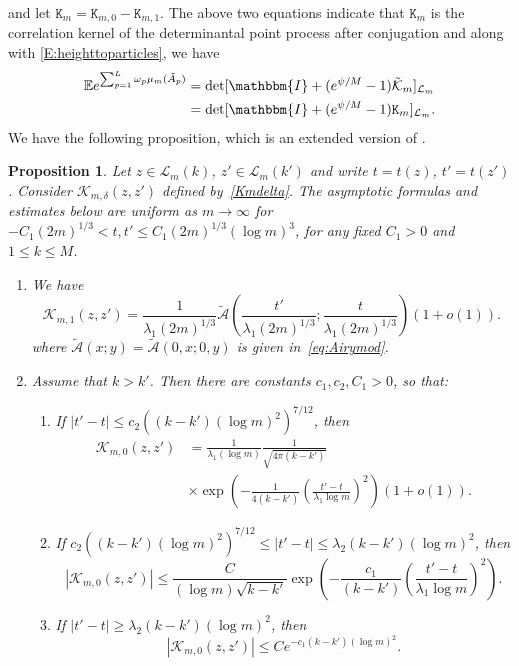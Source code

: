 \documentclass[11pt,twoside]{amsart}
\theoremstyle{plain}
\newtheorem{prop}[thm]{Proposition}
\numberwithin{quest}{section}
\theoremstyle{remark}
\numberwithin{rem}{section}
\theoremstyle{definition}
\begin{document}
and let $\mathtt{K}_m = \mathtt{K}_{m, 0} - \mathtt{K}_{m,1}.$  The above two equations indicate that $\mathtt{K}_m$ is the correlation kernel of the determinantal point process after conjugation and along with \eqref{E:heighttoparticles}, we have
\begin{equation*}
	\begin{split}
		\mathbb{E}e^{\sum_{p=1}^{L} \omega_p \mu_m(\tilde A_p)}&=\det[\mathbbm{I}+(e^{\psi/M}-1)\tilde{\mathcal{K}}_m]_{\mathcal{L}_m}\\
		&=\det[\mathbbm{I}+(e^{\psi/M}-1)\mathtt{K}_m]_{\mathcal{L}_m}.
	\end{split}
\end{equation*}
We have the following proposition, which is an extended version of \cite[Proposition 3.1]{BCJ18}.
\begin{prop} \label{P:airylimit_asymptotics}
	Let $z \in \mathcal{L}_m(k)$, $z' \in \mathcal{L}_m(k')$ and write $t=t(z)$, $t'=t(z')$.  Consider $\mathcal{K}_{m,\delta}(z,z')$ defined by~\eqref{Kmdelta}. 
	The asymptotic formulas and estimates below are uniform as $m\to\infty$ for $-C_1 (2m)^{1/3}< t,t' \leq C_1(2m)^{1/3}(\log m)^3$, for any fixed $C_1>0$ and $1 \leq k \leq M$. 
	\begin{enumerate}[label=\arabic*.]
		\item We have
		\begin{equation*}
			\mathcal{K}_{m,1}(z,z') = \frac{1}{\lambda_1(2m)^{1/3}} \tilde{\mathcal{A}}\left(\frac{t'}{\lambda_1(2m)^{1/3}};\frac{t}{\lambda_1(2m)^{1/3}} \right)(1+o(1)).
		\end{equation*}
		where $\tilde{\mathcal{A}}(x ;y) = \tilde{\mathcal{A}}(0, x; 0, y)$ is given in~\eqref{eq:Airymod}.
		\item Assume that $k>k'$. Then there are constants $c_1,c_2,C_1>0$, so that:
		\begin{enumerate}
			\item If $|t'-t| \leq c_2( (k-k')( \log m )^2)^{7/12}$, then
			\begin{equation*}
				\begin{split}
				\mathcal{K}_{m,0}(z,z')&= \frac{1}{\lambda_1(\log m)} \frac{1}{\sqrt{4 \pi (k-k')}} \\
				&\times \exp \left(-\frac{1}{4(k-k')} \left( \frac{t'-t}{\lambda_1 \log m }\right)^2 \right) (1+o(1)).
				\end{split}
			\end{equation*}
			\item If $ c_2( (k-k')( \log m )^2)^{7/12} \leq  |t'-t| \leq \lambda_2 (k-k') (\log m)^2$, then
			\begin{equation*}
				|\mathcal{K}_{m,0}(z,z')| \leq\frac{C}{(\log m)\sqrt{k-k'}} \exp\left(-\frac{c_1}{(k-k')} \left( \frac{t'-t}{\lambda_1 \log m }\right)^2 \right).
			\end{equation*}
			\item 
		If $|t'-t| \geq \lambda_2 (k-k') (\log m)^2$, then
			\begin{equation*}
				|\mathcal{K}_{m,0}(z,z')| \leq C e^{-c_1(k-k')(\log m)^2}. 
			\end{equation*}
			

\end{enumerate}
\end{enumerate}
\end{prop}
\end{document}
